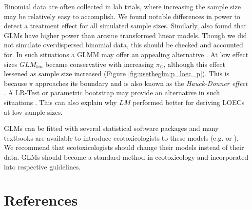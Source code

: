 Binomial data are often collected in lab trials, where increasing the sample size may be relatively easy to accomplish. 
We found notable differences in power to detect a treatment effect for all simulated sample sizes.
Similarly, \citet{warton_arcsine_2011} also found that GLMs have higher power than arcsine transformed linear models.
Though we did not simulate overdispersed binomial data, this should be checked and accounted for.
In such situations a GLMM may offer an appealing alternative \citep{warton_arcsine_2011}.
At low effect sizes $GLM_{bin}$ became conservative with increasing $\pi_C$, although this effect lessened as sample size increased (Figure \ref{fig:usetheglm:p_loec_p}). 
This is because $\pi$ approaches its boundary and is also known as the \emph{Hauck-Donner effect} \citep{hauck_walds_1977}. A LR-Test or parametric bootstrap may provide an alternative in such situations \citep{bolker_generalized_2009}.
This can also explain why $LM$ performed better for deriving LOECs at low sample sizes.

GLMs can be fitted with several statistical software packages and many textbooks are available to introduce ecotoxicologists to these models (e.g. \citealt{zuur_beginners_2013} or \citealt{quinn_experimental_2009}).
We recommend that ecotoxicologists should change their models instead of their data.
GLMs should become a standard method in ecotoxicology and incorporated into respective guidelines.

\section{References}
\printbibliography[heading=none,sorting=nyt]
